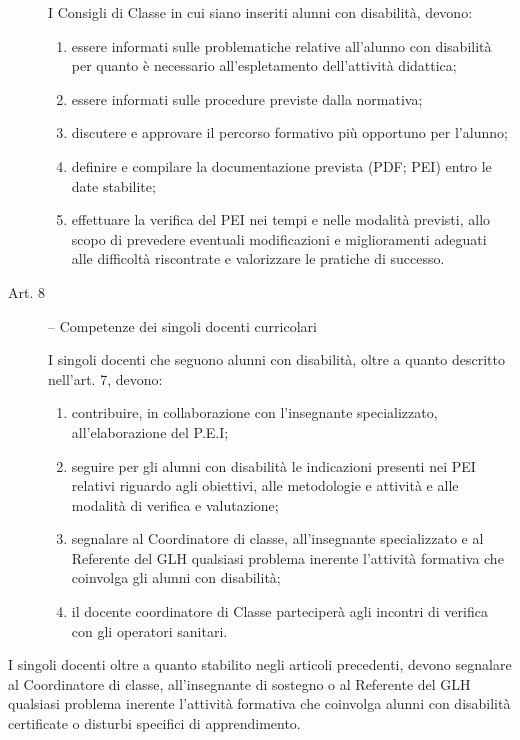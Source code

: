 \begin{description}
	I Consigli di Classe in cui siano inseriti alunni con disabilità, devono:
	\begin{enumerate}
		\item essere informati sulle problematiche relative all'alunno con disabilità per quanto è
		necessario all'espletamento dell'attività didattica;
		\item essere informati sulle procedure previste dalla normativa;
		\item discutere e approvare il percorso formativo più opportuno per l'alunno;
		\item definire e compilare la documentazione prevista (PDF; PEI) entro le date stabilite;
		\item  effettuare la verifica del PEI nei tempi e nelle modalità previsti, allo scopo di prevedere
		eventuali modificazioni e miglioramenti adeguati alle difficoltà riscontrate e valorizzare le
		pratiche di successo.
	\end{enumerate}
	\item [Art. 8] -- Competenze dei singoli docenti curricolari
	
	I singoli docenti che seguono alunni con disabilità, oltre a quanto descritto nell'art. 7, devono:
	\begin{enumerate}
		\item contribuire, in collaborazione con l'insegnante specializzato, all'elaborazione del P.E.I;
		\item seguire per gli alunni con disabilità le indicazioni presenti nei PEI relativi riguardo agli
		obiettivi, alle metodologie e attività e alle modalità di verifica e valutazione;
		\item segnalare al Coordinatore di classe, all'insegnante specializzato e al Referente del GLH
		qualsiasi problema inerente l'attività formativa che coinvolga gli alunni con disabilità;
		\item il docente coordinatore di Classe parteciperà agli incontri di verifica con gli operatori
		sanitari.
	\end{enumerate}
\end{description}

I singoli docenti oltre a quanto stabilito negli articoli precedenti, devono segnalare al Coordinatore
di classe, all'insegnante di sostegno o al Referente del GLH qualsiasi problema inerente l'attività
formativa che coinvolga alunni con disabilità certificate o disturbi specifici di apprendimento.
